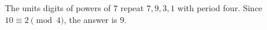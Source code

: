 The units digits of powers of $7$ repeat $7,9,3,1$ with period four. Since $10\equiv2\pmod4$, the answer is $\boxed9$.
